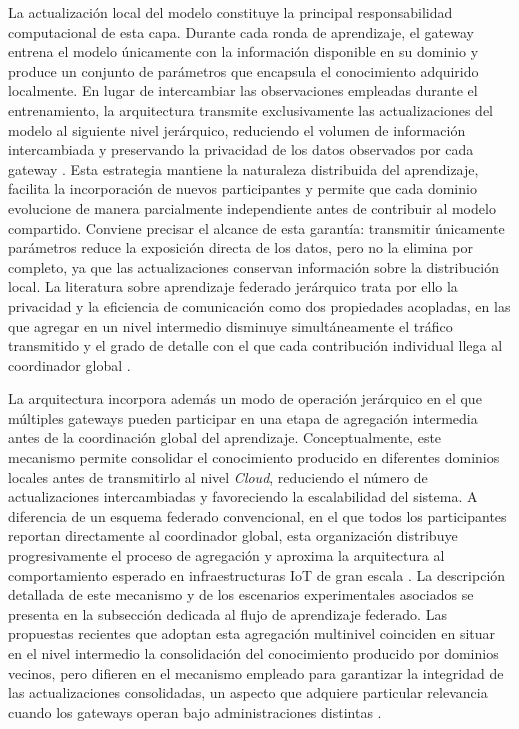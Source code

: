 \documentclass[journal,article,submit,moreauthors]{Definitions/mdpi}
\begin{document}
La actualización local del modelo constituye la principal responsabilidad computacional de esta capa. Durante cada ronda de aprendizaje, el gateway entrena el modelo únicamente con la información disponible en su dominio y produce un conjunto de parámetros que encapsula el conocimiento adquirido localmente. En lugar de intercambiar las observaciones empleadas durante el entrenamiento, la arquitectura transmite exclusivamente las actualizaciones del modelo al siguiente nivel jerárquico, reduciendo el volumen de información intercambiada y preservando la privacidad de los datos observados por cada gateway \cite{Hajj2023,Chaurasia2024,Ficco2024,Ma2024,Cooray2025}. Esta estrategia mantiene la naturaleza distribuida del aprendizaje, facilita la incorporación de nuevos participantes y permite que cada dominio evolucione de manera parcialmente independiente antes de contribuir al modelo compartido. Conviene precisar el alcance de esta garantía: transmitir únicamente parámetros reduce la exposición directa de los datos, pero no la elimina por completo, ya que las actualizaciones conservan información sobre la distribución local. La literatura sobre aprendizaje federado jerárquico trata por ello la privacidad y la eficiencia de comunicación como dos propiedades acopladas, en las que agregar en un nivel intermedio disminuye simultáneamente el tráfico transmitido y el grado de detalle con el que cada contribución individual llega al coordinador global \cite{Ma2024,Bunko2026}.

La arquitectura incorpora además un modo de operación jerárquico en el que múltiples gateways pueden participar en una etapa de agregación intermedia antes de la coordinación global del aprendizaje. Conceptualmente, este mecanismo permite consolidar el conocimiento producido en diferentes dominios locales antes de transmitirlo al nivel \textit{Cloud}, reduciendo el número de actualizaciones intercambiadas y favoreciendo la escalabilidad del sistema. A diferencia de un esquema federado convencional, en el que todos los participantes reportan directamente al coordinador global, esta organización distribuye progresivamente el proceso de agregación y aproxima la arquitectura al comportamiento esperado en infraestructuras IoT de gran escala \cite{Ma2024,Tran2026}. La descripción detallada de este mecanismo y de los escenarios experimentales asociados se presenta en la subsección dedicada al flujo de aprendizaje federado. Las propuestas recientes que adoptan esta agregación multinivel coinciden en situar en el nivel intermedio la consolidación del conocimiento producido por dominios vecinos, pero difieren en el mecanismo empleado para garantizar la integridad de las actualizaciones consolidadas, un aspecto que adquiere particular relevancia cuando los gateways operan bajo administraciones distintas \cite{Tran2026}.
\end{document}
